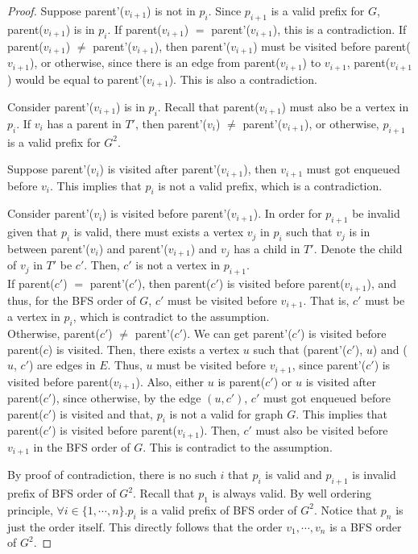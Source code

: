 \documentclass[10pt]{article}
\begin{document}
\begin{enumerate}
\begin{proof}
			Suppose parent'($v_{i+1}$) is not in $p_i$.
			Since $p_{i+1}$ is a valid prefix for $G$, parent($v_{i+1}$) is in
			$p_{i}$.
			If parent($v_{i+1}$) $=$ parent'($v_{i+1}$), this is
			a contradiction.
			If parent($v_{i+1}$) $\neq$ parent'($v_{i+1}$), then
			parent'($v_{i+1}$) must be visited before parent($v_{i+1}$), or
			otherwise, since there is an edge from parent($v_{i+1}$) to
			$v_{i+1}$, parent($v_{i+1}$) would be equal to parent'($v_{i+1}$).
			This is also a contradiction.

			Consider parent'($v_{i+1}$) is in $p_i$.
			Recall that parent($v_{i+1}$) must also be a vertex in $p_i$. 
			If $v_{i}$ has a parent in $T'$, then parent'($v_i$) $\neq$
			parent'($v_{i+1}$), or otherwise, $p_{i+1}$ is a valid prefix for
			$G^2$.

			Suppose parent'($v_i$) is visited after parent'($v_{i+1}$), then
			$v_{i+1}$ must got enqueued before $v_{i}$.
			This implies that $p_i$ is not a valid prefix, which is
			a contradiction.

			Consider parent'($v_i$) is visited before parent'($v_{i+1}$). 
			In order for $p_{i+1}$ be invalid given that $p_i$ is valid, there
			must exists a vertex $v_j$ in $p_i$ such that $v_j$ is in between
			parent'($v_i$) and parent'($v_{i+1}$) and $v_j$ has a child in $T'$.
			Denote the child of $v_j$ in $T'$ be $c'$. 
			Then, $c'$ is not a vertex in $p_{i+1}$. \\
			If parent($c'$) $=$ parent'($c'$), then parent($c'$) is visited
			before parent($v_{i+1}$), and thus, for the BFS order of $G$, $c'$
			must be visited before $v_{i+1}$.
			That is, $c'$ must be a vertex in $p_i$, which is contradict to the
			assumption. \\
			Otherwise, parent($c'$) $\neq$ parent'($c'$). 
			We can get parent'($c'$) is visited before parent($c$) is visited. 
			Then, there exists a vertex $u$ such that (parent'($c'$), $u$)
			and ($u$, $c'$) are edges in $E$. 
			Thus, $u$ must be visited before $v_{i+1}$, since
			parent'($c'$) is visited before parent($v_{i+1}$). 
			Also, either $u$ is parent($c'$) or $u$ is visited after
			parent($c'$), since otherwise, by the edge $(u, c')$, $c'$ must got
			enqueued before parent($c'$) is visited and that, $p_i$ is not
			a valid for graph $G$. 
			This implies that parent($c'$) is visited before parent($v_{i+1}$). 
			Then, $c'$ must also be visited before $v_{i+1}$ in the BFS order
			of $G$. 
			This is contradict to the assumption. 

			By proof of contradiction, there is no such $i$ that $p_i$ is valid
			and $p_{i+1}$ is invalid prefix of BFS order of $G^2$. 
			Recall that $p_1$ is always valid.
			By well ordering principle, $\forall i \in \{1, \cdots, n\}. p_i$
			is a valid prefix of BFS order of $G^2$.
			Notice that $p_n$ is just the order itself. 
			This directly follows that the order $v_1, \cdots, v_n$ is a BFS
			order of $G^2$. 


\end{proof}
\end{enumerate}
\end{document}
